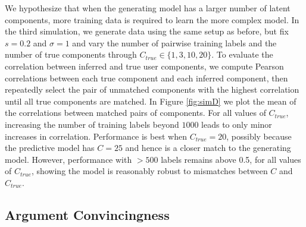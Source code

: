 We hypothesize that when the generating model has 
a larger number of latent components, more training data is required to learn
the more complex model.
In the third simulation, we generate data using the same setup as before, but fix $s=0.2$ and $\sigma=1$
and vary the number of pairwise training labels 
and the number of true components through
$C_{true} \in \{ 1, 3, 10, 20\}$.
To evaluate the correlation between inferred and true user components, 
we compute Pearson correlations between each
true component and each inferred component, then repeatedly select the pair of unmatched components with the highest correlation until all true components
are matched. 
In Figure \ref{fig:simD} we plot the mean of the correlations between matched pairs of components.
For all values of $C_{true}$, increasing the
number of training labels beyond $1000$ leads to only minor increases in correlation. Performance is best when $C_{true} = 20$,
possibly because the predictive model has $C = 25$
and hence is a closer match to the generating model.
However, performance with $>500$ labels remains above 0.5,
for all values of $C_{true}$, showing the model is reasonably robust
to mismatches between $C$ and $C_{true}$.

\subsection{Argument Convincingness}\label{sec:exp_scale}



